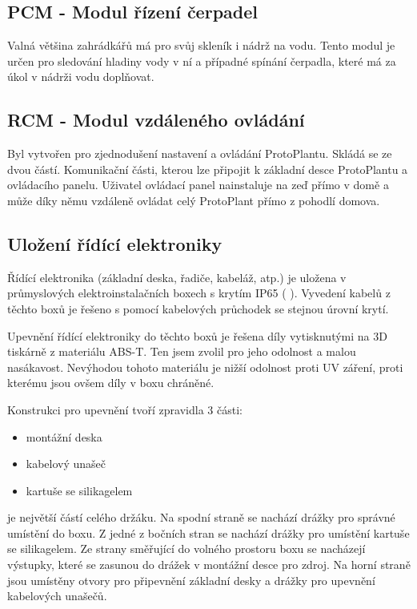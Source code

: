 \subsection{PCM - Modul řízení čerpadel}
\label{subsec:PCM}
Valná většina zahrádkářů má pro svůj skleník i nádrž na vodu.
Tento modul je určen pro sledování hladiny vody v ní a případné spínání čerpadla, které má za úkol v nádrži vodu doplňovat.

\subsection{RCM - Modul vzdáleného ovládání}
\label{subsec:RCM}
Byl vytvořen pro zjednodušení nastavení a ovládání ProtoPlantu.
Skládá se ze dvou částí. 
Komunikační části, kterou lze připojit k základní desce ProtoPlantu a ovládacího panelu. 
Uživatel ovládací panel nainstaluje na zeď přímo v domě a může díky němu vzdáleně ovládat celý ProtoPlant přímo z pohodlí domova. 

\subsection{Uložení řídící elektroniky}
Řídící elektronika (základní deska, řadiče, kabeláž, atp.) je uložena v průmyslových elektroinstalačních boxech s krytím IP65 ( \cite{IP_ratings}).
Vyvedení kabelů z těchto boxů je řešeno s pomocí kabelových průchodek se stejnou úrovní krytí.

Upevnění řídící elektroniky do těchto boxů je řešena díly vytisknutými na 3D tiskárně z materiálu ABS-T.
Ten jsem zvolil pro jeho odolnost a malou nasákavost.
Nevýhodou tohoto materiálu je nižší odolnost proti UV záření, proti kterému jsou ovšem díly v boxu chráněné.

Konstrukci pro upevnění tvoří zpravidla 3 části:
\begin{itemize}
    \item montážní deska
    \item kabelový unašeč
    \item kartuše se silikagelem
\end{itemize}

\noindent{} je největší částí celého držáku. 
Na spodní straně se nachází drážky pro správné umístění do boxu.
Z jedné z bočních stran se nachází drážky pro umístění kartuše se silikagelem.
Ze strany směřující do volného prostoru boxu se nacházejí výstupky, které se zasunou do drážek v montážní desce pro zdroj.
Na horní straně jsou umístěny otvory pro připevnění základní desky a drážky pro upevnění kabelových unašečů.

